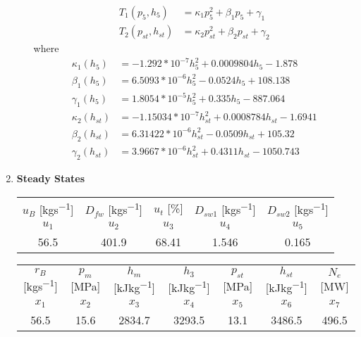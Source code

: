 \documentclass[11pt, a4paper, fleqn]{article}
\begin{document}
\begin{enumerate}
\begin{itemize}
\begin{align*}
 		T_1(p_5,h_5) &= \kappa_1 p_5^2 + \beta_1 p_5 + \gamma_1\\
 		T_2(p_{st},h_{st}) &= \kappa_2 p_{st}^2 + \beta_2 p_{st} + \gamma_2
 	\end{align*}	
 	where
 	\begin{align*}
 		\kappa_1(h_5) &= -1.292*10^{-7}h_5^2 + 0.0009804h_5 - 1.878\\
 		\beta_1(h_5)  &= 6.5093*10^{-6}h_5^2 - 0.0524h_5 + 108.138\\
 		\gamma_1(h_5) &= 1.8054*10^{-5}h_5^2 + 0.335h_5 - 887.064\\
 		\kappa_2(h_{st}) &= -1.15034*10^{-7}h_{st}^2 + 0.0008784h_{st} - 1.6941\\
 		\beta_2(h_{st})  &= 6.31422*10^{-6}h_{st}^2 - 0.0509h_{st} + 105.32\\
 		\gamma_2(h_{st}) &= 3.9667*10^{-6}h_{st}^2 + 0.4311h_{st} - 1050.743
 	\end{align*}
\end{itemize} 

\newpage
 \item \textbf{Steady States}
 \begin{table}[h]
 	\centering
	\begin{tabular}{ccccc}
		$u_B$ [\si{kgs^{-1}}] & $D_{fw}$ [\si{kgs^{-1}}] & $u_t$ [\si{\%}] & $D_{sw1}$ [\si{kgs^{-1}}] & $D_{sw2}$ [\si{kgs^{-1}}] \\
		\textbf{$u_1$} & \textbf{$u_2$} & \textbf{$u_3$} & \textbf{$u_4$} & \textbf{$u_5$} \\
		\hline
		56.5 & 401.9 & 68.41 & 1.546 & 0.165 \\
	\end{tabular}

	\vspace{5pt}
	
	\begin{tabular}{ccccccc}
		$r_B$ [\si{kgs^{-1}}] & $p_m$ [\si{MPa}] & $h_m$ [\si{kJkg^{-1}}] & $h_3$ [\si{kJkg^{-1}}] & $p_{st}$ [\si{MPa}] & $h_{st}$ [\si{kJkg^{-1}}] & $N_e$ [\si{MW}] \\
		\textbf{$x_1$} & \textbf{$x_2$} & \textbf{$x_3$} & \textbf{$x_4$} & \textbf{$x_5$} & \textbf{$x_6$} & \textbf{$x_7$} \\
		\hline
		56.5 & 15.6 & 2834.7 & 3293.5 & 13.1 & 3486.5 & 496.5 \\
	\end{tabular}
 \end{table}

\end{enumerate}
\end{document}

